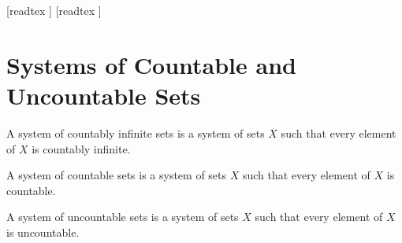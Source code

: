 \documentclass[10pt]{article}
\begin{document}
  \begin{imports}
    \begin{forthel}
      [readtex ]
      [readtex ]
    \end{forthel}
  \end{imports}


  \section*{Systems of Countable and Uncountable Sets}

  \begin{forthel}
    \begin{definition}
      A system of countably infinite sets is a system of sets $X$ such that every element of $X$ is countably infinite.
    \end{definition}
  \end{forthel}

  \begin{forthel}
    \begin{definition}
      A system of countable sets is a system of sets $X$ such that every element of $X$ is countable.
    \end{definition}
  \end{forthel}

  \begin{forthel}
    \begin{definition}
      A system of uncountable sets is a system of sets $X$ such that every element of $X$ is uncountable.
    \end{definition}
  \end{forthel}
\end{document}
